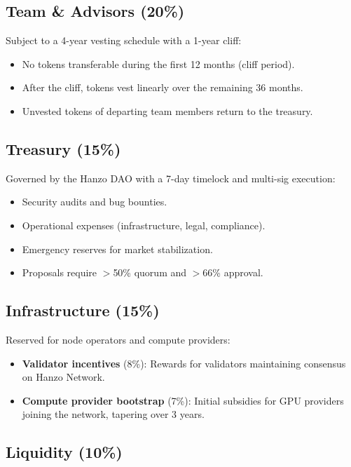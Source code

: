 \documentclass[11pt]{article}
\begin{document}
\subsection{Team \& Advisors (20\%)}

Subject to a 4-year vesting schedule with a 1-year cliff:

\begin{itemize}[leftmargin=1.1em]
    \item No tokens transferable during the first 12 months (cliff period).
    \item After the cliff, tokens vest linearly over the remaining 36 months.
    \item Unvested tokens of departing team members return to the treasury.
\end{itemize}

\subsection{Treasury (15\%)}

Governed by the Hanzo DAO with a 7-day timelock and multi-sig execution:

\begin{itemize}[leftmargin=1.1em]
    \item Security audits and bug bounties.
    \item Operational expenses (infrastructure, legal, compliance).
    \item Emergency reserves for market stabilization.
    \item Proposals require $>$50\% quorum and $>$66\% approval.
\end{itemize}

\subsection{Infrastructure (15\%)}

Reserved for node operators and compute providers:

\begin{itemize}[leftmargin=1.1em]
    \item \textbf{Validator incentives} (8\%): Rewards for validators maintaining
    consensus on Hanzo Network.
    \item \textbf{Compute provider bootstrap} (7\%): Initial subsidies for GPU
    providers joining the network, tapering over 3 years.
\end{itemize}

\subsection{Liquidity (10\%)}
\end{document}
